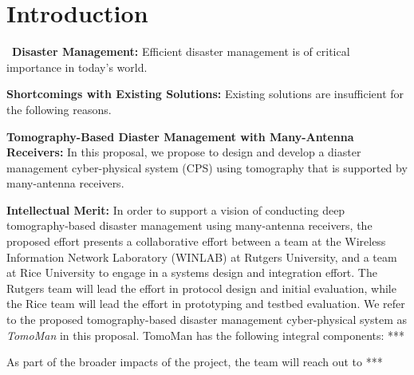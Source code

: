 \vspace{-10mm}
\section{Introduction\label{sec:intro}}
\
\vspace{4pt}\noindent\textbf{Disaster Management:} Efficient disaster management is of critical importance in today's world. 

\vspace{4pt}\noindent\textbf{Shortcomings with Existing Solutions:} Existing solutions are insufficient for the following reasons. 

\vspace{4pt}\noindent\textbf{Tomography-Based Diaster Management with Many-Antenna Receivers:} In this proposal, we propose to design and develop a diaster management cyber-physical system (CPS) using tomography that is supported by many-antenna receivers.  

\vspace{4pt}\noindent\textbf{Intellectual Merit:} In order to support a vision of conducting deep tomography-based disaster management using many-antenna receivers, the proposed effort presents a collaborative effort between a team at the Wireless Information Network Laboratory (WINLAB) at Rutgers University, and a team at Rice University to engage in a systems design and integration effort. The Rutgers team will lead the effort in protocol design and initial evaluation, while the Rice team will lead the effort in prototyping and testbed evaluation. We refer to the proposed tomography-based disaster management cyber-physical system as \emph{TomoMan} in this proposal. TomoMan has the following integral components: ***


As part of the broader impacts of the project, the team will reach out to ***